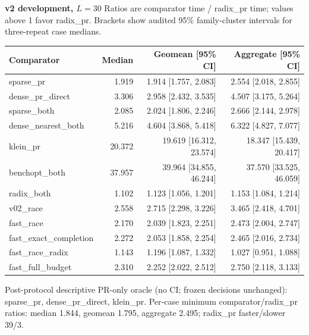 \par\noindent\textbf{v2 development, $L=30$}
Ratios are comparator time / radix\_pr time; values above 1 favor radix\_pr.
Brackets show audited 95\% family-cluster intervals for three-repeat case medians.
\par\smallskip
\begin{tabular}{lrrr}
Comparator & Median & Geomean [95\% CI] & Aggregate [95\% CI] \\
\hline
sparse\_pr & 1.919 & 1.914 [1.757, 2.083] & 2.554 [2.018, 2.855] \\
dense\_pr\_direct & 3.306 & 2.958 [2.432, 3.535] & 4.507 [3.175, 5.264] \\
sparse\_both & 2.085 & 2.024 [1.806, 2.246] & 2.666 [2.144, 2.978] \\
dense\_nearest\_both & 5.216 & 4.604 [3.868, 5.418] & 6.322 [4.827, 7.077] \\
klein\_pr & 20.372 & 19.619 [16.312, 23.574] & 18.347 [15.439, 20.417] \\
benchopt\_both & 37.957 & 39.964 [34.855, 46.244] & 37.570 [33.525, 46.059] \\
radix\_both & 1.102 & 1.123 [1.056, 1.201] & 1.153 [1.084, 1.214] \\
v02\_race & 2.558 & 2.715 [2.298, 3.226] & 3.465 [2.418, 4.701] \\
fast\_race & 2.170 & 2.039 [1.823, 2.251] & 2.473 [2.004, 2.747] \\
fast\_exact\_completion & 2.272 & 2.053 [1.858, 2.254] & 2.465 [2.016, 2.734] \\
fast\_race\_radix & 1.143 & 1.196 [1.087, 1.332] & 1.027 [0.951, 1.088] \\
fast\_full\_budget & 2.310 & 2.252 [2.022, 2.512] & 2.750 [2.118, 3.133] \\
\end{tabular}
\par\smallskip
Post-protocol descriptive PR-only oracle (no CI; frozen decisions unchanged): sparse\_pr, dense\_pr\_direct, klein\_pr.
Per-case minimum comparator/radix\_pr ratios: median 1.844, geomean 1.795, aggregate 2.495; radix\_pr faster/slower 39/3.

